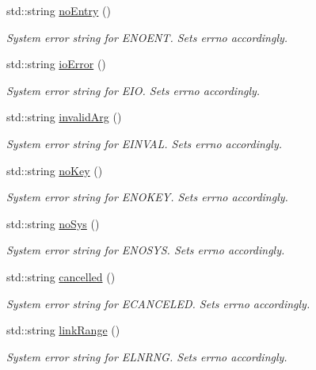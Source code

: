 \begin{DoxyCompactItemize}
std\+::string \hyperlink{namespace_d_d4hep_1_1_errors_aca021db58d08e5935eea31a7d0b7d1b7}{no\+Entry} ()
\begin{DoxyCompactList}\small\item\em System error string for E\+N\+O\+E\+NT. Sets errno accordingly. \end{DoxyCompactList}\item 
std\+::string \hyperlink{namespace_d_d4hep_1_1_errors_af232117521264a5f6e1211c887e265fd}{io\+Error} ()
\begin{DoxyCompactList}\small\item\em System error string for E\+IO. Sets errno accordingly. \end{DoxyCompactList}\item 
std\+::string \hyperlink{namespace_d_d4hep_1_1_errors_ab559bb58296daa1eed2725c602cb2483}{invalid\+Arg} ()
\begin{DoxyCompactList}\small\item\em System error string for E\+I\+N\+V\+AL. Sets errno accordingly. \end{DoxyCompactList}\item 
std\+::string \hyperlink{namespace_d_d4hep_1_1_errors_ace8817a7446265e17083aa87e73d6019}{no\+Key} ()
\begin{DoxyCompactList}\small\item\em System error string for E\+N\+O\+K\+EY. Sets errno accordingly. \end{DoxyCompactList}\item 
std\+::string \hyperlink{namespace_d_d4hep_1_1_errors_a70d74e1cb3eced52822c830c2bf4990b}{no\+Sys} ()
\begin{DoxyCompactList}\small\item\em System error string for E\+N\+O\+S\+YS. Sets errno accordingly. \end{DoxyCompactList}\item 
std\+::string \hyperlink{namespace_d_d4hep_1_1_errors_a69cd23934005401444f50404ab454f53}{cancelled} ()
\begin{DoxyCompactList}\small\item\em System error string for E\+C\+A\+N\+C\+E\+L\+ED. Sets errno accordingly. \end{DoxyCompactList}\item 
std\+::string \hyperlink{namespace_d_d4hep_1_1_errors_a6e59237308b289629424651a17eb8163}{link\+Range} ()
\begin{DoxyCompactList}\small\item\em System error string for E\+L\+N\+R\+NG. Sets errno accordingly. \end{DoxyCompactList}\end{DoxyCompactItemize}


